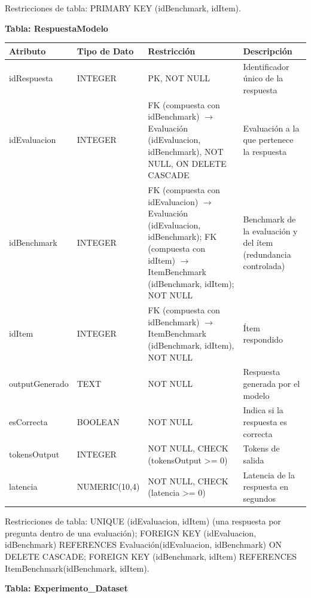 \documentclass[12pt,a4paper]{article}
\begin{document}
Restricciones de tabla: PRIMARY KEY (idBenchmark, idItem).

\textbf{Tabla: RespuestaModelo}

\begin{longtable}{|>{\raggedright\arraybackslash}p{3.45cm}|>{\raggedright\arraybackslash}p{3.45cm}|>{\raggedright\arraybackslash}p{3.45cm}|>{\raggedright\arraybackslash}p{3.45cm}|}
\hline
\textbf{Atributo} & \textbf{Tipo de Dato} & \textbf{Restricción} & \textbf{Descripción} \\
\hline
idRespuesta & INTEGER & PK, NOT NULL & Identificador único de la respuesta \\
\hline
idEvaluacion & INTEGER & FK (compuesta con idBenchmark) $\rightarrow$ Evaluación (idEvaluacion, idBenchmark), NOT NULL, ON DELETE CASCADE & Evaluación a la que pertenece la respuesta \\
\hline
idBenchmark & INTEGER & FK (compuesta con idEvaluacion) $\rightarrow$ Evaluación (idEvaluacion, idBenchmark); FK (compuesta con idItem) $\rightarrow$ ItemBenchmark (idBenchmark, idItem); NOT NULL & Benchmark de la evaluación y del ítem (redundancia controlada) \\
\hline
idItem & INTEGER & FK (compuesta con idBenchmark) $\rightarrow$ ItemBenchmark (idBenchmark, idItem), NOT NULL & Ítem respondido \\
\hline
outputGenerado & TEXT & NOT NULL & Respuesta generada por el modelo \\
\hline
esCorrecta & BOOLEAN & NOT NULL & Indica si la respuesta es correcta \\
\hline
tokensOutput & INTEGER & NOT NULL, CHECK (tokensOutput >= 0) & Tokens de salida \\
\hline
latencia & NUMERIC(10,4) & NOT NULL, CHECK (latencia >= 0) & Latencia de la respuesta en segundos \\
\hline
\end{longtable}

Restricciones de tabla: UNIQUE (idEvaluacion, idItem) (una respuesta por pregunta dentro de una evaluación); FOREIGN KEY (idEvaluacion, idBenchmark) REFERENCES Evaluación(idEvaluacion, idBenchmark) ON DELETE CASCADE; FOREIGN KEY (idBenchmark, idItem) REFERENCES ItemBenchmark(idBenchmark, idItem).

\textbf{Tabla: Experimento\_Dataset}
\end{document}
